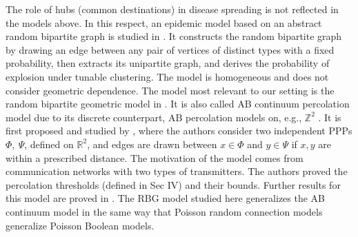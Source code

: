  
 The role of hubs (common destinations) in disease spreading is not reflected in the models above. In this respect, an epidemic model based on an abstract random bipartite graph is studied in \cite{britton2008epidemics}. It constructs the random bipartite graph by drawing an edge between any pair of vertices of distinct types with a fixed probability, then extracts its unipartite graph, and derives the probability of explosion under tunable clustering. The model is homogeneous and does not consider geometric dependence. The model most relevant to our setting is the random bipartite geometric model in \cite{iyer2012percolation,penrose_2014}. It is also called AB continuum percolation model due to its discrete counterpart, AB percolation models on, e.g., $\mathbb{Z}^2$ \cite[Chapter 12]{grimmett1999percolation}. It is first proposed and studied by \cite{iyer2012percolation}, where the authors consider two independent PPPs $\Phi,~\Psi$, defined on $\mathbb{R}^2$, and edges are drawn between $x\in\Phi$ and $y\in \Psi$ if $x,y$ are within a prescribed distance. The motivation of the model comes from communication networks with two types of transmitters. The authors proved the percolation thresholds (defined in Sec IV) and their bounds. Further results for this model are proved in \cite{penrose_2014}. The RBG model studied here generalizes the AB continuum model in the same way that Poisson random connection models generalize Poisson Boolean models.